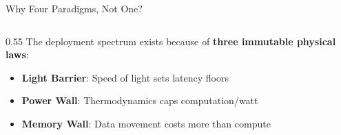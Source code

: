 \documentclass[aspectratio=169, 12pt]{beamer}
\begin{document}
\begin{frame}{Why Four Paradigms, Not One?}
\note{
%
%
%
%
}

\footnotesize
\begin{columns}[T]
  \begin{column}{0.55\textwidth}
    The deployment spectrum exists because of \textbf{three immutable physical laws}:

    \vspace{0.1cm}
    \begin{itemize}\setlength\itemsep{1pt}
      \item \textcolor{routingstroke}{\textbf{Light Barrier}}: Speed of light sets latency floors
      \item \textcolor{errorstroke}{\textbf{Power Wall}}: Thermodynamics caps computation/watt
      \item \textcolor{datastroke}{\textbf{Memory Wall}}: Data movement costs more than compute
    \end{itemize}


\end{column}
\end{columns}
\end{frame}
\end{document}
